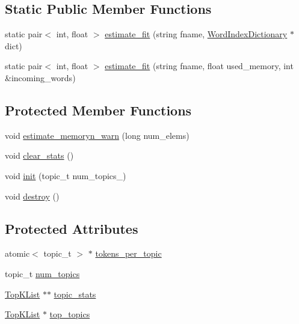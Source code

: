 \subsection*{Static Public Member Functions}
\begin{DoxyCompactItemize}
\item 
static pair$<$ int, float $>$ \hyperlink{class_type_topic_counts_a050a1b09ad130d2ac048511df424e53b}{estimate\_\-fit} (string fname, \hyperlink{class_word_index_dictionary}{WordIndexDictionary} $\ast$dict)
\item 
static pair$<$ int, float $>$ \hyperlink{class_type_topic_counts_ae32981836e13dd9a54bfd79224063a12}{estimate\_\-fit} (string fname, float used\_\-memory, int \&incoming\_\-words)
\end{DoxyCompactItemize}
\subsection*{Protected Member Functions}
\begin{DoxyCompactItemize}
\item 
void \hyperlink{class_type_topic_counts_ab69a6701ed9e110f9c5ac25e933899ec}{estimate\_\-memoryn\_\-warn} (long num\_\-elems)
\item 
void \hyperlink{class_type_topic_counts_a0e039d80803bd0d1310d8d34478651ec}{clear\_\-stats} ()
\item 
void \hyperlink{class_type_topic_counts_a6eb9abe7c1ca5cfeaf15d49b910fd24f}{init} (topic\_\-t num\_\-topics\_\-)
\item 
void \hyperlink{class_type_topic_counts_a0ed91f07819b6534de5592d22e6278d3}{destroy} ()
\end{DoxyCompactItemize}
\subsection*{Protected Attributes}
\begin{DoxyCompactItemize}
\item 
atomic$<$ topic\_\-t $>$ $\ast$ \hyperlink{class_type_topic_counts_ab1fcbc4b5558d7d8df4404d5db290e8d}{tokens\_\-per\_\-topic}
\item 
topic\_\-t \hyperlink{class_type_topic_counts_a11093a2580f604279b5799ef494a8e66}{num\_\-topics}
\item 
\hyperlink{class_top_k_list}{TopKList} $\ast$$\ast$ \hyperlink{class_type_topic_counts_a1fd0fdd37107d5837fe5cc78191f5e8a}{topic\_\-stats}
\item 
\hyperlink{class_top_k_list}{TopKList} $\ast$ \hyperlink{class_type_topic_counts_aa31724ba039f4e58d2ac2d3344b94d46}{top\_\-topics}
\end{DoxyCompactItemize}
